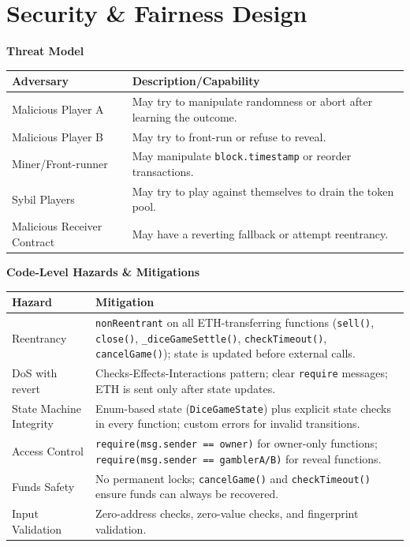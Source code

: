 \documentclass[10pt,a4paper]{article}
\begin{document}
\section{Security \& Fairness Design}
\begingroup
\small
\textbf{Threat Model}

\begin{tabularx}{\textwidth}{@{}>{\raggedright\arraybackslash}p{}X@{}}
\toprule
\textbf{Adversary} & \textbf{Description/Capability} \\
\midrule
Malicious Player A & May try to manipulate randomness or abort after learning the outcome. \\
Malicious Player B & May try to front-run or refuse to reveal. \\
Miner/Front-runner & May manipulate \texttt{block.timestamp} or reorder transactions. \\
Sybil Players & May try to play against themselves to drain the token pool. \\
Malicious Receiver Contract & May have a reverting fallback or attempt reentrancy. \\
\bottomrule
\end{tabularx}

\medskip
\textbf{Code-Level Hazards \& Mitigations}

\begin{tabularx}{\textwidth}{@{}>{\raggedright\arraybackslash}p{}X@{}}
\toprule
\textbf{Hazard} & \textbf{Mitigation} \\
\midrule
Reentrancy & \texttt{nonReentrant} on all ETH-transferring functions (\texttt{sell()}, \texttt{close()}, \texttt{\_diceGameSettle()}, \texttt{checkTimeout()}, \texttt{cancelGame()}); state is updated before external calls. \\
DoS with revert & Checks-Effects-Interactions pattern; clear \texttt{require} messages; ETH is sent only after state updates. \\
State Machine Integrity & Enum-based state (\texttt{DiceGameState}) plus explicit state checks in every function; custom errors for invalid transitions. \\
Access Control & \texttt{require(msg.sender == owner)} for owner-only functions; \texttt{require(msg.sender == gamblerA/B)} for reveal functions. \\
Funds Safety & No permanent locks; \texttt{cancelGame()} and \texttt{checkTimeout()} ensure funds can always be recovered. \\
Input Validation & Zero-address checks, zero-value checks, and fingerprint validation. \\
\bottomrule
\end{tabularx}
\end{document}
